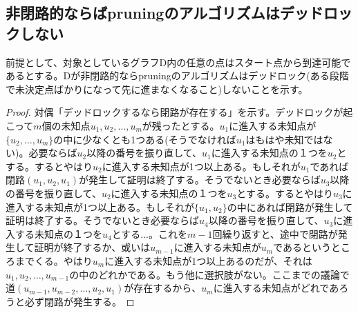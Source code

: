 			\subsection{非閉路的ならばpruningのアルゴリズムはデッドロックしない}
				前提として、対象としているグラフD内の任意の点はスタート点から到達可能であるとする。Dが非閉路的ならpruningのアルゴリズムはデッドロック(ある段階で未決定点ばかりになって先に進まなくなること)しないことを示す。
				\begin{proof}
					\quad\par
					対偶「デッドロックするなら閉路が存在する」を示す。デッドロックが起こって$m$個の未知点$u_1,u_2,\dotsc,u_m$が残ったとする。$u_1$に進入する未知点が$\{u_2,\dotsc,u_m\}$の中に少なくとも1つある(そうでなければ$u_1$はもはや未知ではない)。必要ならば$u_2$以降の番号を振り直して、$u_1$に進入する未知点の１つを$u_2$とする。するとやはり$u_2$に進入する未知点が1つ以上ある。もしそれが$u_1$であれば閉路$(u_1,u_2,u_1)$が発生して証明は終了する。そうでないとき必要ならば$u_3$以降の番号を振り直して、$u_2$に進入する未知点の１つを$u_3$とする。するとやはり$u_3$に進入する未知点が1つ以上ある。もしそれが$\{u_1,u_2\}$の中にあれば閉路が発生して証明は終了する。そうでないとき必要ならば$u_4$以降の番号を振り直して、$u_3$に進入する未知点の１つを$u_4$とする...。これを$m-1$回繰り返すと、途中で閉路が発生して証明が終了するか、或いは$u_{m-1}$に進入する未知点が$u_m$であるというところまでくる。やはり$u_m$に進入する未知点が1つ以上あるのだが、それは$u_1,u_2,\dotsc,u_{m-1}$の中のどれかである。もう他に選択肢がない。ここまでの議論で道$(u_{m-1},u_{m-2},\dotsc,u_2,u_1)$が存在するから、$u_m$に進入する未知点がどれであろうと必ず閉路が発生する。
				\end{proof}
